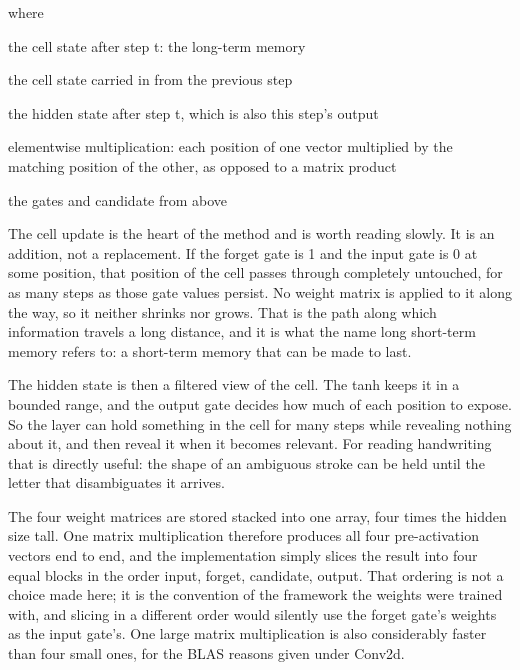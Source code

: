\noindent where
\begin{description}[leftmargin=2.4em,style=nextline,font=\normalfont\ttfamily]\setlength\itemsep{1pt}
  \item[{$c_t$}] \normalfont the cell state after step t: the long-term memory
  \item[{$c_{t-1}$}] \normalfont the cell state carried in from the previous step
  \item[{$h_t$}] \normalfont the hidden state after step t, which is also this step's output
  \item[{$\odot$}] \normalfont elementwise multiplication: each position of one vector multiplied by the matching position of the other, as opposed to a matrix product
  \item[{$f_t,\, i_t,\, g_t,\, o_t$}] \normalfont the gates and candidate from above
\end{description}
The cell update is the heart of the method and is worth reading slowly. It is an addition, not a replacement. If the forget gate is 1 and the input gate is 0 at some position, that position of the cell passes through completely untouched, for as many steps as those gate values persist. No weight matrix is applied to it along the way, so it neither shrinks nor grows. That is the path along which information travels a long distance, and it is what the name long short-term memory refers to: a short-term memory that can be made to last.

The hidden state is then a filtered view of the cell. The tanh keeps it in a bounded range, and the output gate decides how much of each position to expose. So the layer can hold something in the cell for many steps while revealing nothing about it, and then reveal it when it becomes relevant. For reading handwriting that is directly useful: the shape of an ambiguous stroke can be held until the letter that disambiguates it arrives.


The four weight matrices are stored stacked into one array, four times the hidden size tall. One matrix multiplication therefore produces all four pre-activation vectors end to end, and the implementation simply slices the result into four equal blocks in the order input, forget, candidate, output. That ordering is not a choice made here; it is the convention of the framework the weights were trained with, and slicing in a different order would silently use the forget gate's weights as the input gate's. One large matrix multiplication is also considerably faster than four small ones, for the BLAS reasons given under Conv2d.


